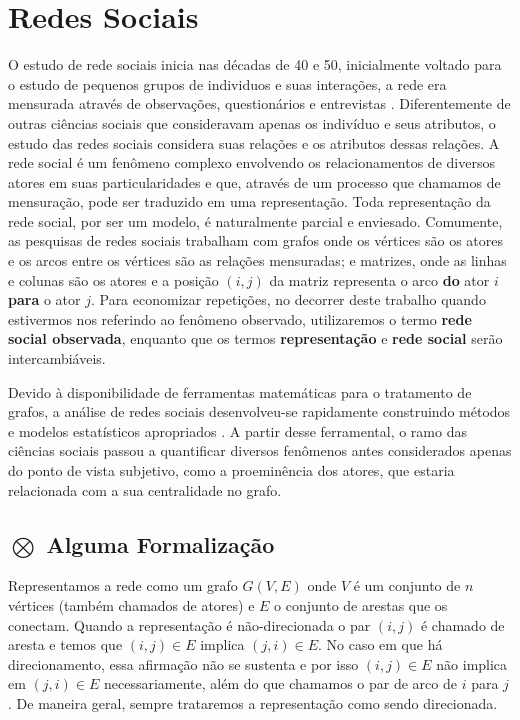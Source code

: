 \chapter{Redes Sociais}
\label{ch:redes}
O estudo de rede sociais inicia nas décadas de 40 e 50, inicialmente voltado para
o estudo de pequenos grupos de individuos e suas interações, a rede era mensurada
através de observações, questionários e entrevistas \citep{Wasserman}.
Diferentemente de outras ciências sociais que consideravam apenas os indivíduo e
seus atributos, o estudo das redes sociais considera suas relações e os atributos
dessas relações. A rede social é um fenômeno complexo envolvendo os
relacionamentos de diversos atores em suas particularidades e que, através de um
processo que chamamos de mensuração, pode ser traduzido em uma representação.
Toda representação da rede social, por ser um modelo, é naturalmente parcial e
enviesado. Comumente, as pesquisas de redes sociais trabalham com grafos onde os
vértices são os atores e os arcos entre os vértices são as relações mensuradas; e
matrizes, onde as linhas e colunas são os atores e a posição $(i,j)$ da matriz
representa o arco \textbf{do} ator $i$ \textbf{para} o ator $j$. Para economizar
repetições, no decorrer deste trabalho quando estivermos nos referindo ao
fenômeno observado, utilizaremos o termo \textbf{rede social observada}, enquanto
que os termos \textbf{representação} e \textbf{rede social} serão
intercambiáveis.

Devido à disponibilidade de ferramentas matemáticas para o tratamento de grafos,
a análise de redes sociais desenvolveu-se rapidamente construindo métodos e
modelos estatísticos apropriados \citep{Butts2009}. A partir desse ferramental,
o ramo das ciências sociais passou a quantificar diversos fenômenos antes
considerados apenas do ponto de vista subjetivo, como a proeminência dos atores,
que estaria relacionada com a sua centralidade no grafo.

\section{$\bigotimes$ Alguma Formalização}

Representamos a rede como um grafo $G(V,E)$ onde $V$ é um conjunto de $n$
vértices (também chamados de atores) e $E$ o conjunto de arestas que os conectam.
Quando a representação é não-direcionada o par $(i,j)$ é chamado de aresta e
temos que $(i,j) \in E$ implica $(j,i) \in E$. No caso em que há direcionamento,
essa afirmação não se sustenta e por isso $(i,j) \in E$ não implica em $(j,i) \in
E$ necessariamente, além do que chamamos o par de arco de $i$ para $j$. De
maneira geral, sempre trataremos a representação como sendo direcionada.

